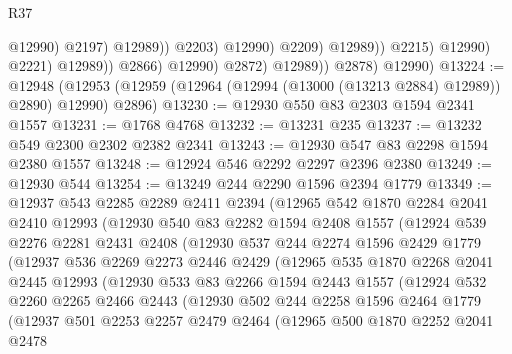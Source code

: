 \begin{lexlean}{R37}
\begin{coremodule}
                                              @12990)
                                            @2197)
                                          @12989))
                                      @2203)
                                    @12990)
                                  @2209)
                                @12989))
                            @2215)
                          @12990)
                        @2221)
                      @12989))
                  @2866)
                @12990)
              @2872)
            @12989))
        @2878)
      @12990)
@13224 := @12948
    (@12953 (@12959 (@12964 (@12994 (@13000 (@13213 @2884) @12989)) @2890) @12990) @2896)
@13230 := @12930 @550 @83 @2303 @1594 @2341 @1557
@13231 := @1768 @4768
@13232 := @13231 @235
@13237 := @13232 @549 @2300 @2302 @2382 @2341
@13243 := @12930 @547 @83 @2298 @1594 @2380 @1557
@13248 := @12924 @546 @2292 @2297 @2396 @2380
@13249 := @12930 @544
@13254 := @13249 @244 @2290 @1596 @2394 @1779
@13349 := @12937
    @543
    @2285
    @2289
    @2411
    @2394
    (@12965
      @542
      @1870
      @2284
      @2041
      @2410
      @12993
      (@12930
        @540
        @83
        @2282
        @1594
        @2408
        @1557
        (@12924
          @539
          @2276
          @2281
          @2431
          @2408
          (@12930
            @537
            @244
            @2274
            @1596
            @2429
            @1779
            (@12937
              @536
              @2269
              @2273
              @2446
              @2429
              (@12965
                @535
                @1870
                @2268
                @2041
                @2445
                @12993
                (@12930
                  @533
                  @83
                  @2266
                  @1594
                  @2443
                  @1557
                  (@12924
                    @532
                    @2260
                    @2265
                    @2466
                    @2443
                    (@12930
                      @502
                      @244
                      @2258
                      @1596
                      @2464
                      @1779
                      (@12937
                        @501
                        @2253
                        @2257
                        @2479
                        @2464
                        (@12965
                          @500
                          @1870
                          @2252
                          @2041
                          @2478

\end{coremodule}
\end{lexlean}
